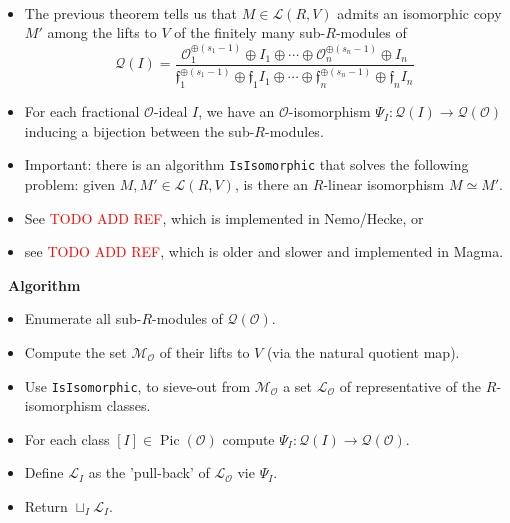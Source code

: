 \documentclass[usenames,dvipsnames]{beamer}
\DeclareMathOperator{\Pic}{Pic}
\newcommand{\cO}{{\mathcal O}}
\newcommand{\cL}{{\mathcal L}}
\newcommand{\cM}{{\mathcal M}}
\newcommand{\cQ}{{\mathcal Q}}
\newcommand{\frf}{{\mathfrak f}}
\newcommand{\red}[1]{\textcolor{red}{#1}}
\begin{document}
\begin{frame}{}\
   \begin{itemize}
      \item The previous theorem tells us that $M\in \cL(R,V)$ admits an isomorphic copy $M'$ among the lifts to $V$ of the finitely many sub-$R$-modules of 
      \[ \cQ(I) = \dfrac{\cO_1^{\oplus(s_1-1)}\oplus I_1\oplus\cdots\oplus\cO_n^{\oplus(s_n-1)}\oplus I_n}{\frf_1^{\oplus(s_1-1)}\oplus \frf_1I_1 \oplus \cdots \oplus\frf_n^{\oplus(s_n-1)}\oplus \frf_nI_n} \]
      \item For each fractional $\cO$-ideal $I$, we have an $\cO$-isomorphism $\Psi_I:\cQ(I)\to \cQ(\cO)$ inducing a bijection between the sub-$R$-modules.
      \item Important: there is an algorithm \texttt{IsIsomorphic} that
      solves the following problem:
      \pause given $M,M'\in\cL(R,V)$, is there an $R$-linear isomorphism $M\simeq M'$.
      \item See \red{TODO ADD REF}, which is implemented in Nemo/Hecke, or
      \item see \red{TODO ADD REF}, which is older and slower and implemented in Magma. 
   \end{itemize}
\end{frame}

\begin{frame}{}\
   {\bf Algorithm}
   \begin{itemize}
      \item Enumerate all sub-$R$-modules of $\cQ(\cO)$.
      \item Compute the set $\cM_\cO$ of their lifts to $V$ (via the natural quotient map).
      \item Use \texttt{IsIsomorphic}, to sieve-out from $\cM_\cO$ a set $\cL_\cO$ of representative of the $R$-isomorphism classes.
      \item For each class $[I] \in \Pic(\cO)$ compute $\Psi_I:\cQ(I)\to \cQ(\cO)$.
      \item Define $\cL_I$ as the 'pull-back' of $\cL_\cO$ vie $\Psi_I$.
      \item Return $\sqcup_I \cL_I$.
   \end{itemize}
\end{frame}
\end{document}
